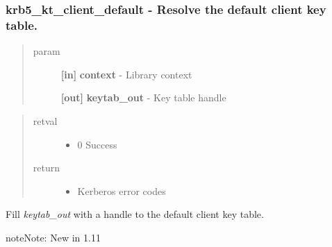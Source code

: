 \documentclass[letterpaper,10pt,english]{sphinxmanual}
\begin{document}
\subsubsection{krb5\_kt\_client\_default -  Resolve the default client key table.}
\label{appdev/refs/api/krb5_kt_client_default::doc}\label{appdev/refs/api/krb5_kt_client_default:krb5-kt-client-default-resolve-the-default-client-key-table}

\begin{fulllineitems}
\label{appdev/refs/api/krb5_kt_client_default:krb5_kt_client_default}
\end{fulllineitems}

\begin{quote}\begin{description}
\item[{param}] \leavevmode
\textbf{{[}in{]}} \textbf{context} - Library context

\textbf{{[}out{]}} \textbf{keytab\_out} - Key table handle

\end{description}\end{quote}
\begin{quote}\begin{description}
\item[{retval}] \leavevmode\begin{itemize}
\item {} 
0   Success

\end{itemize}

\item[{return}] \leavevmode\begin{itemize}
\item {} 
Kerberos error codes

\end{itemize}

\end{description}\end{quote}

Fill \emph{keytab\_out} with a handle to the default client key table.

\begin{notice}{note}{Note:}
New in 1.11
\end{notice}
\end{document}
